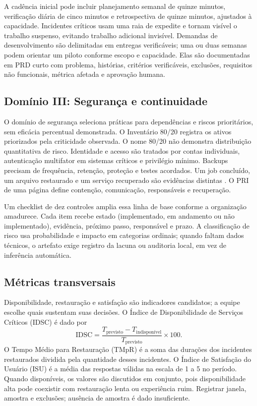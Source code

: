 A cadência inicial pode incluir planejamento semanal de quinze minutos, verificação diária de cinco minutos e retrospectiva de quinze minutos, ajustados à capacidade. Incidentes críticos usam uma raia de expedite e tornam visível o trabalho suspenso, evitando trabalho adicional invisível. Demandas de desenvolvimento são delimitadas em entregas verificáveis; uma ou duas semanas podem orientar um piloto conforme escopo e capacidade. Elas são documentadas em PRD curto com problema, histórias, critérios verificáveis, exclusões, requisitos não funcionais, métrica afetada e aprovação humana.

\subsection{Domínio III: Segurança e continuidade}

O domínio de segurança seleciona práticas para dependências e riscos prioritários, sem eficácia percentual demonstrada. O Inventário 80/20 registra os ativos priorizados pela criticidade observada. O nome 80/20 não demonstra distribuição quantitativa de risco. Identidade e acesso são tratados por contas individuais, autenticação multifator em sistemas críticos e privilégio mínimo. Backups precisam de frequência, retenção, proteção e testes acordados. Um job concluído, um arquivo restaurado e um serviço recuperado são evidências distintas \citep{nist2024smallbusiness}. O PRI de uma página define contenção, comunicação, responsáveis e recuperação.

Um checklist de dez controles amplia essa linha de base conforme a organização amadurece. Cada item recebe estado (implementado, em andamento ou não implementado), evidência, próximo passo, responsável e prazo. A classificação de risco usa probabilidade e impacto em categorias ordinais; quando faltam dados técnicos, o artefato exige registro da lacuna ou auditoria local, em vez de inferência automática.

\subsection{Métricas transversais}

Disponibilidade, restauração e satisfação são indicadores candidatos; a equipe escolhe quais sustentam suas decisões. O Índice de Disponibilidade de Serviços Críticos (IDSC) é dado por
\begin{equation}
  \mathrm{IDSC}=\frac{T_{\text{previsto}}-T_{\text{indisponível}}}{T_{\text{previsto}}}\times 100.
\end{equation}
O Tempo Médio para Restauração (TMpR) é a soma das durações dos incidentes restaurados dividida pela quantidade desses incidentes. O Índice de Satisfação do Usuário (ISU) é a média das respostas válidas na escala de 1 a 5 no período. Quando disponíveis, os valores são discutidos em conjunto, pois disponibilidade alta pode coexistir com restauração lenta ou experiência ruim. Registrar janela, amostra e exclusões; ausência de amostra é dado insuficiente.

